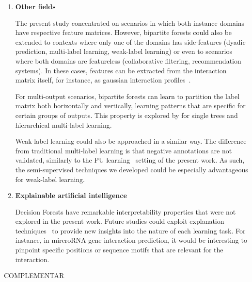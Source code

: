 \begin{enumerate}
    \item \textbf{Other fields}

    The present study concentrated on scenarios in which both instance domains have respective feature matrices. However, bipartite forests could also be extended to contexts where only one of the domains has side-features (dyadic prediction, multi-label learning, weak-label learning) or even to scenarios where both domains are featureless (collaborative filtering, recommendation systems).
    In these cases, features can be extracted from the interaction matrix itself, for instance, as gaussian interaction profiles~\cite{vanlaarhoven2011gaussian}.

    For multi-output scenarios, bipartite forests 
    can learn to partition the label matrix both horizontally and vertically, learning patterns that are specific for certain groups of outputs. This property is explored by \cite{zaminth} for single trees and hierarchical multi-label learning.

    Weak-label learning could also be approached in a similar way. The difference from traditional multi-label learning is that negative annotations are not validated, similarly to the PU learning~\cite{bekker2020learning} setting of the present work. As such, the semi-supervised techniques we developed could be especially advantageous for weak-label learning.

    \item \textbf{Explainable artificial intelligence}

    Decision Forests have remarkable interpretability properties that were not explored in the present work. Future studies could exploit explanation techniques~\cite{mdi, mdi+, treeshap} to provide new insights into the nature of each learning task.
    For instance, in mircroRNA-gene interaction prediction, it would be interesting to pinpoint specific positions or sequence motifs that are relevant for the interaction.

\end{enumerate}


COMPLEMENTAR  %
